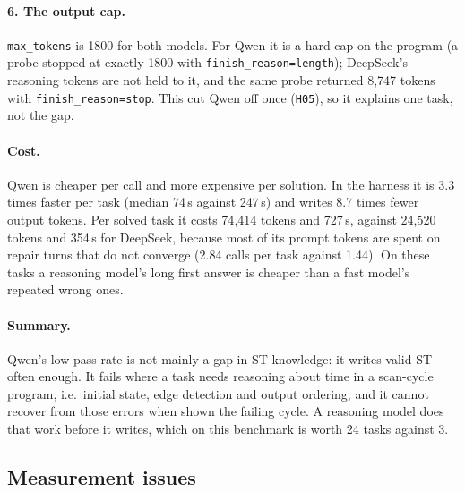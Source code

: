 \paragraph{6. The output cap.}
\texttt{max\_tokens} is 1800 for both models. For Qwen it is a hard cap on the
program (a probe stopped at exactly 1800 with \texttt{finish\_reason=length});
DeepSeek's reasoning tokens are not held to it, and the same probe returned
8{,}747 tokens with \texttt{finish\_reason=stop}. This cut Qwen off once
(\texttt{H05}), so it explains one task, not the gap.

\paragraph{Cost.}
Qwen is cheaper per call and more expensive per solution. In the harness it is
3.3 times faster per task (median 74\,s against 247\,s) and writes 8.7 times
fewer output tokens. Per solved task it costs 74{,}414 tokens and 727\,s,
against 24{,}520 tokens and 354\,s for DeepSeek, because most of its prompt
tokens are spent on repair turns that do not converge (2.84 calls per task
against 1.44). On these tasks a reasoning model's long first answer is cheaper
than a fast model's repeated wrong ones.

\paragraph{Summary.}
Qwen's low pass rate is not mainly a gap in ST knowledge: it writes valid ST
often enough. It fails where a task needs reasoning about time in a scan-cycle
program, i.e.\ initial state, edge detection and output ordering, and it cannot
recover from those errors when shown the failing cycle. A reasoning model does
that work before it writes, which on this benchmark is worth 24 tasks against 3.

\subsection{Measurement issues}

